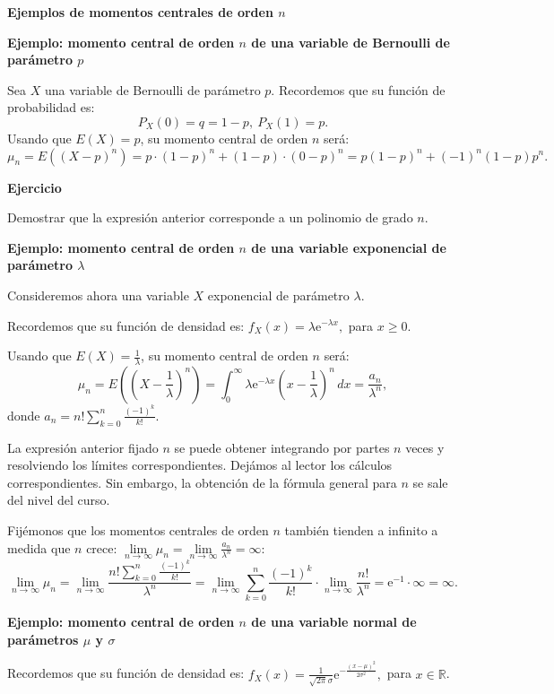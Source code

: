 \documentclass[]{book}
\begin{document}
\textbf{Ejemplos de momentos centrales de orden \(n\)}

\textbf{Ejemplo: momento central de orden \(n\) de una variable de Bernoulli de parámetro \(p\)}

Sea \(X\) una variable de Bernoulli de parámetro \(p\). Recordemos que su función de probabilidad es:
\[
P_X(0)=q=1-p,\ P_X(1)=p.
\]
Usando que \(E(X)=p\), su momento central de orden \(n\) será:
\[
\mu_n = E\left((X-p)^n\right)=p\cdot (1-p)^n+(1-p)\cdot (0-p)^n = p(1-p)^n + (-1)^n (1-p) p^n.
\]

\textbf{Ejercicio}

Demostrar que la expresión anterior corresponde a un polinomio de grado \(n\).

\textbf{Ejemplo: momento central de orden \(n\) de una variable exponencial de parámetro \(\lambda\)}

Consideremos ahora una variable \(X\) exponencial de parámetro \(\lambda\).

Recordemos que su función de densidad es: \(f_X(x)=\lambda \mathrm{e}^{-\lambda x},\) para \(x\geq 0\).

Usando que \(E(X)=\frac{1}{\lambda}\), su momento central de orden \(n\) será:
\[
\mu_n = E\left(\left(X-\frac{1}{\lambda}\right)^n\right)=\int_0^\infty \lambda \mathrm{e}^{-\lambda x} \left(x-\frac{1}{\lambda}\right)^n\, dx =\frac{a_n}{\lambda^n},
\]
donde \(a_n = n!\sum\limits_{k=0}^n \frac{(-1)^k}{k!}.\)

La expresión anterior fijado \(n\) se puede obtener integrando por partes \(n\) veces y resolviendo los límites correspondientes. Dejámos al lector los cálculos correspondientes. Sin embargo, la obtención de la fórmula general para \(n\) se sale del nivel del curso.

Fijémonos que los momentos centrales de orden \(n\) también tienden a infinito a medida que \(n\) crece: \(\lim\limits_{n\to\infty}\mu_n = \lim\limits_{n\to\infty}\frac{a_n}{\lambda^n}=\infty\):
\[
\lim_{n\to\infty}\mu_n =\lim_{n\to\infty} \frac{n!\sum\limits_{k=0}^n \frac{(-1)^k}{k!}}{\lambda^n}= 
\lim_{n\to\infty}\sum\limits_{k=0}^n \frac{(-1)^k}{k!}\cdot \lim_{n\to\infty} \frac{n!}{\lambda^n}= \mathrm{e}^{-1}\cdot \infty = \infty.
\]

\textbf{Ejemplo: momento central de orden \(n\) de una variable normal de parámetros \(\mu\) y \(\sigma\)}

Recordemos que su función de densidad es: \(f_X(x)=\frac{1}{\sqrt{2\pi}\sigma}\mathrm{e}^{-\frac{(x-\mu)^2}{2\sigma^2}},\) para \(x\in \mathbb{R}\).
\end{document}
